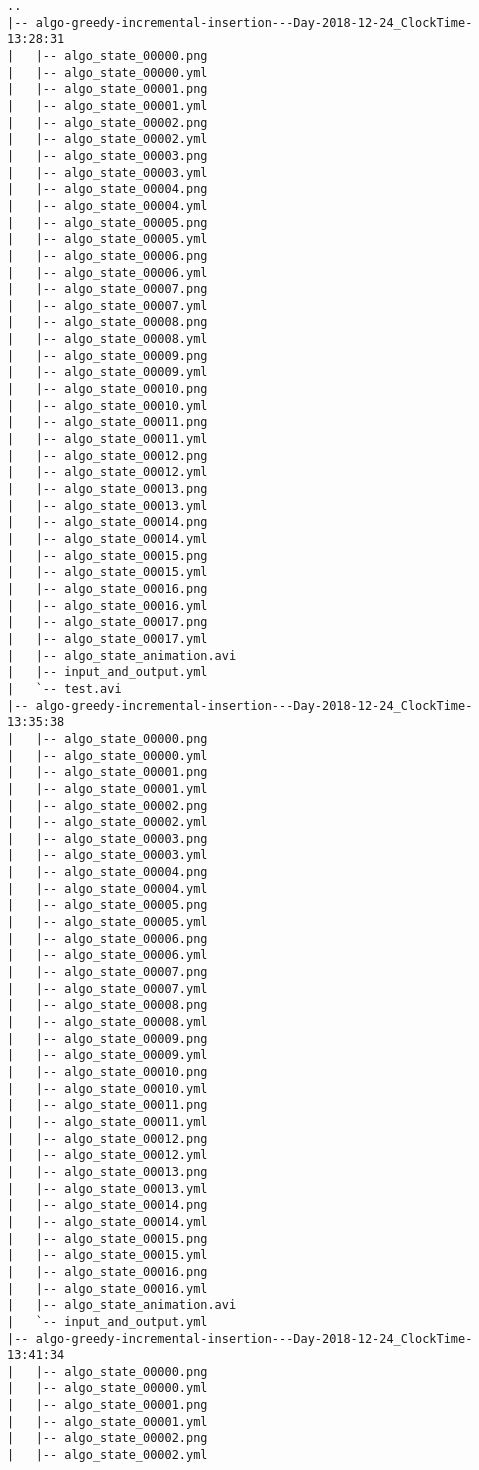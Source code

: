 \begin{verbatim}
..
|-- algo-greedy-incremental-insertion---Day-2018-12-24_ClockTime-13:28:31
|   |-- algo_state_00000.png
|   |-- algo_state_00000.yml
|   |-- algo_state_00001.png
|   |-- algo_state_00001.yml
|   |-- algo_state_00002.png
|   |-- algo_state_00002.yml
|   |-- algo_state_00003.png
|   |-- algo_state_00003.yml
|   |-- algo_state_00004.png
|   |-- algo_state_00004.yml
|   |-- algo_state_00005.png
|   |-- algo_state_00005.yml
|   |-- algo_state_00006.png
|   |-- algo_state_00006.yml
|   |-- algo_state_00007.png
|   |-- algo_state_00007.yml
|   |-- algo_state_00008.png
|   |-- algo_state_00008.yml
|   |-- algo_state_00009.png
|   |-- algo_state_00009.yml
|   |-- algo_state_00010.png
|   |-- algo_state_00010.yml
|   |-- algo_state_00011.png
|   |-- algo_state_00011.yml
|   |-- algo_state_00012.png
|   |-- algo_state_00012.yml
|   |-- algo_state_00013.png
|   |-- algo_state_00013.yml
|   |-- algo_state_00014.png
|   |-- algo_state_00014.yml
|   |-- algo_state_00015.png
|   |-- algo_state_00015.yml
|   |-- algo_state_00016.png
|   |-- algo_state_00016.yml
|   |-- algo_state_00017.png
|   |-- algo_state_00017.yml
|   |-- algo_state_animation.avi
|   |-- input_and_output.yml
|   `-- test.avi
|-- algo-greedy-incremental-insertion---Day-2018-12-24_ClockTime-13:35:38
|   |-- algo_state_00000.png
|   |-- algo_state_00000.yml
|   |-- algo_state_00001.png
|   |-- algo_state_00001.yml
|   |-- algo_state_00002.png
|   |-- algo_state_00002.yml
|   |-- algo_state_00003.png
|   |-- algo_state_00003.yml
|   |-- algo_state_00004.png
|   |-- algo_state_00004.yml
|   |-- algo_state_00005.png
|   |-- algo_state_00005.yml
|   |-- algo_state_00006.png
|   |-- algo_state_00006.yml
|   |-- algo_state_00007.png
|   |-- algo_state_00007.yml
|   |-- algo_state_00008.png
|   |-- algo_state_00008.yml
|   |-- algo_state_00009.png
|   |-- algo_state_00009.yml
|   |-- algo_state_00010.png
|   |-- algo_state_00010.yml
|   |-- algo_state_00011.png
|   |-- algo_state_00011.yml
|   |-- algo_state_00012.png
|   |-- algo_state_00012.yml
|   |-- algo_state_00013.png
|   |-- algo_state_00013.yml
|   |-- algo_state_00014.png
|   |-- algo_state_00014.yml
|   |-- algo_state_00015.png
|   |-- algo_state_00015.yml
|   |-- algo_state_00016.png
|   |-- algo_state_00016.yml
|   |-- algo_state_animation.avi
|   `-- input_and_output.yml
|-- algo-greedy-incremental-insertion---Day-2018-12-24_ClockTime-13:41:34
|   |-- algo_state_00000.png
|   |-- algo_state_00000.yml
|   |-- algo_state_00001.png
|   |-- algo_state_00001.yml
|   |-- algo_state_00002.png
|   |-- algo_state_00002.yml

\end{verbatim}
